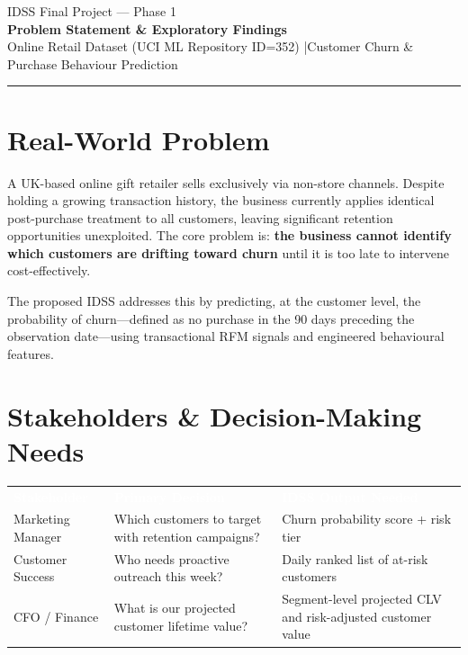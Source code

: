 \documentclass[12pt, a4paper]{article}
\newcommand{\thead}[1]{\textcolor{white}{\textbf{#1}}}
\begin{document}

{\color{midgray}\small IDSS Final Project --- Phase 1}\\[2pt]
{\color{accent}\LARGE\bfseries Problem Statement \& Exploratory Findings}\\[4pt]
{\color{midgray}\small Online Retail Dataset (UCI ML Repository ID=352) \quad|\quad Customer Churn \& Purchase Behaviour Prediction}\\[2pt]
\textcolor{tableborder}{\rule{\linewidth}{0.5pt}}

\vspace{4pt}

\section{Real-World Problem}

A UK-based online gift retailer sells exclusively via non-store channels. Despite holding a growing
transaction history, the business currently applies identical post-purchase treatment to all
customers, leaving significant retention opportunities unexploited. The core problem is:
\textbf{the business cannot identify which customers are drifting toward churn} until it is too
late to intervene cost-effectively.

The proposed IDSS addresses this by predicting, at the customer level, the probability of
churn---defined as no purchase in the 90 days preceding the observation date---using
transactional RFM signals and engineered behavioural features.

\section{Stakeholders \& Decision-Making Needs}

\vspace{4pt}
\renewcommand{\arraystretch}{1.2}
\begin{tabularx}{\linewidth}{
  >{}L{3.3cm}
  Y
  Y
}
\thead{Stakeholder} & \thead{Primary Decision} & \thead{IDSS Output Needed} \\
Marketing Manager &
  Which customers to target with retention campaigns? &
  Churn probability score + risk tier \\
Customer Success &
  Who needs proactive outreach this week? &
  Daily ranked list of at-risk customers \\
CFO / Finance &
  What is our projected customer lifetime value? &
  Segment-level projected CLV and risk-adjusted customer value \\
\end{tabularx}
\end{document}
